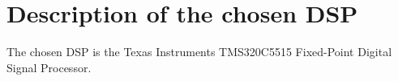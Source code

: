 \section{Description of the chosen DSP}

The chosen DSP is the Texas Instruments TMS320C5515 Fixed-Point Digital Signal Processor.